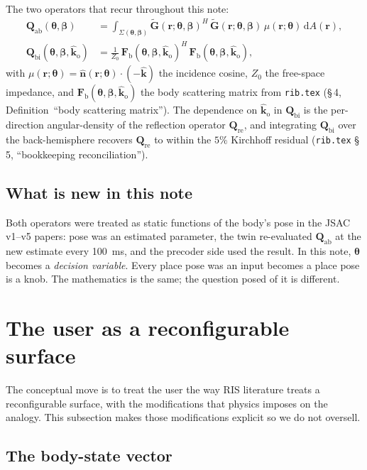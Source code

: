 \documentclass[11pt,a4paper]{article}
\theoremstyle{definition}
\newcommand{\khat}{\hat{\bm{k}}}
\newcommand{\nhat}{\hat{\bm{n}}}
\newcommand{\rr}{\mathbf{r}}
\newcommand{\diff}{\mathrm{d}}
\newcommand{\Gtil}{\tilde{\mathbf{G}}}
\newcommand{\Qabs}{\mathbf{Q}_{\mathrm{ab}}}
\newcommand{\Qref}{\mathbf{Q}_{\mathrm{re}}}
\newcommand{\kout}{\hat{\bm{k}}_{\mathrm{o}}}
\newcommand{\Frib}{\mathbf{F}_{\mathrm{b}}}
\newcommand{\Qbist}{\mathbf{Q}_{\mathrm{bi}}}
\newcommand{\thetab}{\bm{\theta}}
\newcommand{\betab}{\bm{\beta}}
\begin{document}
The two operators that recur throughout this note:
\begin{align}
  \Qabs(\thetab,\betab)
  &= \int_{\Sigma(\thetab,\betab)}
     \Gtil(\rr;\thetab,\betab)^H\,\Gtil(\rr;\thetab,\betab)\,
     \mu(\rr;\thetab)\,\diff A(\rr),
  \label{eq:Qabs-def}\\[0.2em]
  \Qbist(\thetab,\betab,\kout)
  &= \frac{1}{Z_0}\,\Frib(\thetab,\betab,\kout)^H\,
     \Frib(\thetab,\betab,\kout),
  \label{eq:Qbist-def}
\end{align}
with $\mu(\rr;\thetab)=\nhat(\rr;\thetab)\cdot(-\khat)$ the
incidence cosine, $Z_0$ the free-space impedance, and
$\Frib(\thetab,\betab,\kout)$ the body scattering matrix from
\texttt{rib.tex} (\S\,4, Definition~``body scattering matrix'').  The
dependence on $\kout$ in $\Qbist$ is the per-direction
angular-density of the reflection operator $\Qref$, and integrating
$\Qbist$ over the back-hemisphere recovers $\Qref$ to within the
$5\%$ Kirchhoff residual (\texttt{rib.tex} \S\,5,
``bookkeeping reconciliation'').

\subsection{What is new in this note}

Both operators were treated as static functions of the body's pose
in the JSAC v1--v5 papers: pose was an estimated parameter, the twin
re-evaluated $\Qabs$ at the new estimate every \SI{100}{ms}, and the
precoder side used the result.  In this note, $\thetab$ becomes a
\emph{decision variable}.  Every place pose was an input becomes a
place pose is a knob.  The mathematics is the same; the question
posed of it is different.

\section{The user as a reconfigurable surface}\label{sec:user-recon}

The conceptual move is to treat the user the way RIS literature
treats a reconfigurable surface, with the modifications that physics
imposes on the analogy.  This subsection makes those modifications
explicit so we do not oversell.

\subsection{The body-state vector}\label{sec:state}
\end{document}
